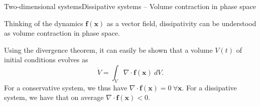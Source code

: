 \documentclass[usenames,dvipsnames,svgnames,10pt,aspectratio=169]{beamer}
\begin{document}
\begin{frame}[t, c]{Two-dimensional systems}{Dissipative systems -- Volume contraction in phase space}
  \begin{minipage}{.68\textwidth}
    Thinking of the dynamics $\bm{f}(\bm{x})$ as a vector field, dissipativity can be understood as volume contraction in phase space.

    \bigskip

    Using the divergence theorem, it can easily be shown that a volume $V(t)$ of initial conditions evolves as
    \[
    \dot{V} = \int_{V} \nabla \cdot \bm{f}(\bm{x})\  dV.
    \]
    For a conservative system, we thus have $\nabla \cdot \bm{f}(\bm{x}) = 0 \ \forall \bm{x}$.
    For a dissipative system, we have that on average $\nabla \cdot \bm{f}(\bm{x}) < 0$.
  \end{minipage}%
  \hfill
  \begin{minipage}{.28\textwidth}
    \centering
  \end{minipage}

  \vspace{1cm}
\end{frame}
\end{document}
